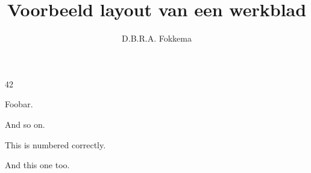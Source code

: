 

\usepackage{lipsum}

\title{Voorbeeld layout van een werkblad}
\author{D.B.R.A. Fokkema}



\maketitle

\begin{questions}


\question \lipsum[1]
\begin{solution}
  42
\end{solution}

\question Foobar.

\question And so on.



\question This is numbered correctly.


\question And this one too.


\end{questions}

